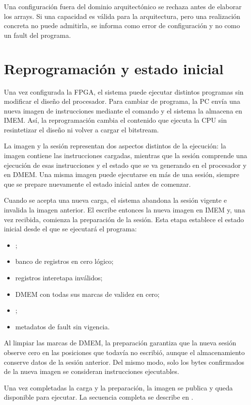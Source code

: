 Una configuración fuera del dominio arquitectónico se rechaza antes de
elaborar los arrays. Si una capacidad es válida para la arquitectura, pero una
realización concreta no puede admitirla, se informa como error de
configuración y no como un fault del programa.

\section{Reprogramación y estado inicial}

Una vez configurada la FPGA, el sistema puede ejecutar distintos programas sin
modificar el diseño del procesador. Para cambiar de programa, la PC envía una
nueva imagen de instrucciones mediante el comando  y el sistema la
almacena en IMEM. Así, la reprogramación cambia el contenido que ejecuta la
CPU sin resintetizar el diseño ni volver a cargar el bitstream.

La imagen y la sesión representan dos aspectos distintos de la ejecución: la
imagen contiene las instrucciones cargadas, mientras que la sesión comprende
una ejecución de esas instrucciones y el estado que se va generando en el
procesador y en DMEM. Una misma imagen puede ejecutarse en más de una sesión,
siempre que se prepare nuevamente el estado inicial antes de comenzar.

Cuando se acepta una nueva carga, el sistema abandona la sesión vigente e
invalida la imagen anterior. El  escribe entonces la nueva imagen
en IMEM y, una vez recibida, comienza la preparación de la sesión. Esta etapa
establece el estado inicial desde el que se ejecutará el programa:

\begin{itemize}
  \item {};
  \item banco de registros en cero lógico;
  \item registros interetapa inválidos;
  \item DMEM con todas sus marcas de validez en cero;
  \item {};
  \item metadatos de fault sin vigencia.
\end{itemize}

Al limpiar las marcas de DMEM, la preparación garantiza que la nueva sesión
observe cero en las posiciones que todavía no escribió, aunque el almacenamiento
conserve datos de la sesión anterior. Del mismo modo, solo los bytes confirmados
de la nueva imagen se consideran instrucciones ejecutables.

Una vez completadas la carga y la preparación, la imagen se publica y queda
disponible para ejecutar. La secuencia completa se describe en
.

